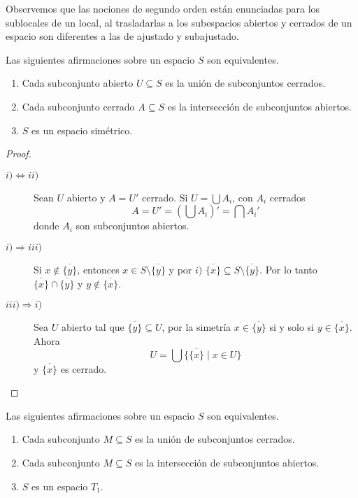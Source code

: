 \documentclass{comunicaciones}
\begin{document}
Observemos que las nociones de segundo orden están enunciadas para los sublocales de un local, al trasladarlas a los subespacios abiertos y cerrados de un espacio son diferentes a las de ajustado y subajustado.

\begin{prop}
Las siguientes afirmaciones sobre un espacio $S$ son equivalentes.
\begin{enumerate}[$i)$]
    \item Cada subconjunto abierto $U\subseteq S$ es la unión de subconjuntos cerrados.
    \item Cada subconjunto cerrado $A\subseteq S$ es la intersección de subconjuntos abiertos.
    \item $S$ es un espacio simétrico.
\end{enumerate}
\end{prop}

\begin{proof}
    \begin{description}
        \item[$i)\Leftrightarrow ii)$] Sean $U$ abierto y $A=U'$ cerrado. Si $U=\bigcup A_i$, con $A_i$ cerrados
        \[
        A=U'=(\bigcup A_i)'=\bigcap A_i'
        \]
        donde $A_i$ son subconjuntos abiertos.
        \item[$i)\Rightarrow iii)$] Si $x\notin \overline{\{y\}}$, entonces $x\in S\setminus \overline{\{y\}}$ y por $i)$ $\overline{\{x\}}\subseteq S\setminus \overline{\{y\}}$. Por lo tanto $\overline{\{x\}}\cap \overline{\{y\}}$ y $y\notin \overline{\{x\}}$. 
        \item[$iii)\Rightarrow i)$] Sea $U$ abierto tal que $\overline{\{y\}}\subseteq U$, por la simetría $x\in \overline{\{y\}}$ si y solo si $y\in \overline{\{x\}}$. Ahora 
        \[
        U=\bigcup\{\overline{\{x\}}\mid x\in U\}
        \]
        y $\overline{\{x\}}$ es cerrado.
    \end{description}
\end{proof}

\begin{prop}
    Las siguientes afirmaciones sobre un espacio $S$ son equivalentes.
    \begin{enumerate}[$i)$]
        \item Cada subconjunto $M\subseteq S$ es la unión de subconjuntos cerrados.
        \item Cada subconjunto $M\subseteq S$ es la intersección de subconjuntos abiertos.
        \item $S$ es un espacio $T_1$.
    \end{enumerate}
\end{prop}
\end{document}
